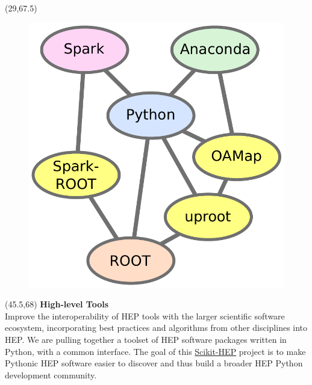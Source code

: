 \documentclass[final]{beamer}
\begin{document}
\begin{frame}{}
\begin{textblock}{12.5}(29,67.5)
\begin{figure}[tbph]
\centering
\includegraphics[width=\textwidth]{images/new_relationship.pdf}
\end{figure}
\end{textblock}


\begin{textblock}{23}(45.5,68)
\textcolor{mybluelabel}{\bf High-level Tools} \\
Improve the interoperability of HEP tools with the larger scientific software ecosystem, incorporating best practices and algorithms from other disciplines into HEP.
We are pulling together a toolset of HEP software packages written in Python, with a common interface.
The goal of this \href{https://github.com/scikit-hep}{Scikit-HEP} project is to make Pythonic HEP software easier to discover and thus build a broader HEP Python development community.
\end{textblock}


\end{frame}
\end{document}
